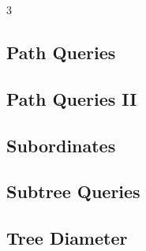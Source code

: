 \documentclass[8pt]{extarticle}
\begin{document}
\begin{multicols*}{3}
\subsection{Path Queries}
\begin{caixaenunciado}

\end{caixaenunciado}
\vspace{0.3cm}


\subsection{Path Queries II}
\begin{caixaenunciado}

\end{caixaenunciado}
\vspace{0.3cm}


\subsection{Subordinates}
\begin{caixaenunciado}

\end{caixaenunciado}
\vspace{0.3cm}


\subsection{Subtree Queries}
\begin{caixaenunciado}

\end{caixaenunciado}
\vspace{0.3cm}


\subsection{Tree Diameter}
\begin{caixaenunciado}

\end{caixaenunciado}
\vspace{0.3cm}



\end{multicols*}
\end{document}
